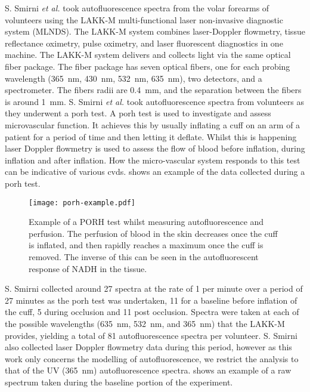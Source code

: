 S. Smirni \textit{et al.} took autofluorescence spectra from the volar forearms of volunteers using the LAKK-M multi-functional laser non-invasive diagnostic system (MLNDS)\@.
The LAKK-M system combines laser-Doppler flowmetry, tissue reflectance oximetry, pulse oximetry, and laser fluorescent diagnostics in one machine.
The LAKK-M system delivers and collects light via the same optical fiber package.
The fiber package has seven optical fibers, one for each probing wavelength (365~nm, 430~nm, 532~nm, 635~nm), two detectors, and a spectrometer.
The fibers radii are 0.4~mm, and the separation between the fibers is around 1~mm.
S. Smirni \textit{et al.} took autofluorescence spectra from volunteers as they underwent a \gls*{porh} test.
A \gls*{porh} test is used to investigate and assess microvascular function.
It achieves this by usually inflating a cuff on an arm of a patient for a period of time and then letting it deflate.
Whilst this is happening laser Doppler flowmetry is used to assess the flow of blood before inflation, during inflation and after inflation.
How the micro-vascular system responds to this test can be indicative of various \gls*{cvds}.
 shows an example of the data collected during a \gls*{porh} test.


\begin{figure}[!htpb]
  \centering
  \texttt{[image: porh-example.pdf]}
  \caption{Example of a PORH test whilst measuring autofluorescence and perfusion. The perfusion of blood in the skin decreases once the cuff is inflated, and then rapidly reaches a maximum once the cuff is removed. The inverse of this can be seen in the autofluorescent response of NADH in the tissue.}
  \label{fig:porh}
\end{figure}

S. Smirni collected around 27 spectra at the rate of 1 per minute over a period of 27 minutes as the \gls*{porh} test was undertaken, 11 for a baseline before inflation of the cuff, 5 during occlusion and 11 post occlusion.
Spectra were taken at each of the possible wavelengths (635~nm, 532~nm, and 365~nm) that the LAKK-M provides, yielding a total of 81 autofluorescence spectra per volunteer.
S. Smirni also collected laser Doppler flowmetry data during this period, however as this work only concerns the modelling of autofluorescence, we restrict the analysis to that of the UV (365~nm) autofluorescence spectra.
 shows an example of a raw spectrum taken during the baseline portion of the experiment.

